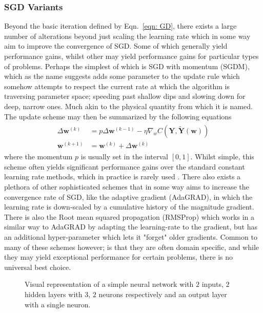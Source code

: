 \documentclass[reprint, english, nofootinbib]{revtex4-2}
\begin{document}
\subsubsection{SGD Variants}
\noindent
Beyond the basic iteration defined by Eqn.~\ref{eqn: GD}, there exists a large number of alterations beyond just scaling the learning rate which in some way aim to improve the convergence of SGD. Some of which generally yield performance gains, whilst other may yield performance gains for particular types of problems. Perhaps the simplest of which is SGD with momentum (SGDM), which as the name suggests adds some parameter to the update rule which somehow attempts to respect the current rate at which the algorithm is traversing parameter space; speeding past shallow dips and slowing down for deep, narrow ones. Much akin to the physical quantity from which it is named. The update scheme may then be summarized by the following equations
\begin{align}\label{eqn: SGDM}
    \begin{split}
        \Delta \pmb w^{(k)} &= p \Delta\pmb w^{(k-1)} - \eta \nabla_wC(\pmb Y, \tilde{\pmb Y}(\pmb w)) \\
        \pmb w^{(k+1)} &= \pmb w^{(k)} + \Delta\pmb w^{(k)}
    \end{split}
\end{align}
where the momentum $p$ is usually set in the interval $[0, 1]$. Whilst simple, this scheme often yields significant performance gains over the standard constant learning rate methods, which in practice is rarely used \cite{Mehta_2019}. There also exists a plethora of other sophisticated schemes that in some way aims to increase the convergence rate of SGD, like the adaptive gradient (AdaGRAD), in which the learning rate is down-scaled by a cumulative history of the magnitude gradient. There is also the Root mean squared propagation (RMSProp) which works in a similar way to AdaGRAD by adapting the learning-rate to the gradient, but has an additional hyper-parameter which lets it "forget" older gradients. Common to many of these schemes however; is that they are often domain specific, and while they may yield exceptional performance for certain problems, there is no universal best choice.

\begin{figure}[h!tb]
    \center
    \vspace{5mm} %
    
    \caption{\label{fig: NN Fig} Visual representation of a simple neural network with $2$ inputs, $2$ hidden layers with $3$, $2$ neurons respectively and an output layer with a single neuron.}
\end{figure}
\end{document}
